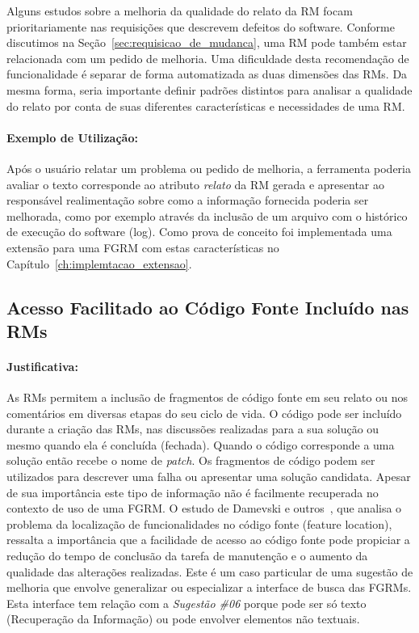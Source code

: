 Alguns estudos sobre a melhoria da qualidade do relato da RM focam
prioritariamente nas requisições que descrevem defeitos do software. Conforme
discutimos na Seção~\ref{sec:requisicao_de_mudanca}, uma RM pode também estar
relacionada com um pedido de melhoria. Uma dificuldade desta recomendação de
funcionalidade é separar de forma automatizada as duas dimensões das RMs. Da
mesma forma, seria importante definir padrões distintos para analisar a
qualidade do relato por conta de suas diferentes características e necessidades
de uma RM\@.

\paragraph{Exemplo de Utilização:}\label{par:exemplo_s01}

Após o usuário relatar um problema ou pedido de melhoria, a ferramenta poderia
avaliar o texto corresponde ao atributo \textit{relato} da RM gerada e
apresentar ao responsável realimentação sobre como a informação fornecida
poderia ser melhorada, como por exemplo através da inclusão de um arquivo com o
histórico de execução do software (log). Como prova de conceito foi
implementada uma extensão para uma FGRM com estas características no
Capítulo~\ref{ch:implemtacao_extensao}.

\subsection{Acesso Facilitado ao Código Fonte Incluído nas RMs}\label{sub:busca_por_código_fonte}


\paragraph{Justificativa:}\label{par:justificativa_s02}

As RMs permitem a inclusão de fragmentos de código fonte em seu relato ou nos
comentários em diversas etapas do seu ciclo de vida. O código pode ser incluído
durante a criação das RMs, nas discussões realizadas para a sua solução ou
mesmo quando ela é concluída (fechada). Quando o código corresponde a uma
solução então recebe o nome de \textit{patch}. Os fragmentos de código podem
ser utilizados para descrever uma falha ou apresentar uma solução candidata.
Apesar de sua importância este tipo de informação não é facilmente recuperada
no contexto de uso de uma FGRM\@. O estudo de Damevski e
outros~\cite{damevski2016field}, que analisa o problema da localização de
funcionalidades no código fonte (feature location), ressalta a importância que
a facilidade de acesso ao código fonte pode propiciar a redução do tempo de
conclusão da tarefa de manutenção e o aumento da qualidade das alterações
realizadas. Este é um caso particular de uma sugestão de melhoria que envolve
generalizar ou especializar a interface de busca das FGRMs. Esta interface tem
relação com a \textit{Sugestão \#06} porque pode ser só texto (Recuperação da
Informação) ou pode envolver elementos não textuais.

